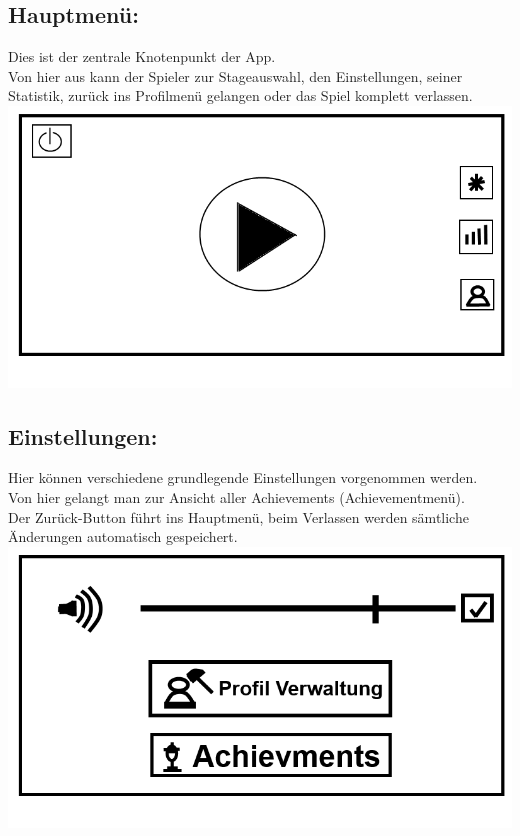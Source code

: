 \documentclass{scrartcl}
\begin{document}
\begin{enumerate}
	\begin{minipage}{1\textwidth}
		\item \subsection*{Hauptmenü:} \label{appaufbau:Hauptmenü}
		Dies ist der zentrale Knotenpunkt der App.\\
		Von hier aus kann der Spieler zur Stageauswahl, den Einstellungen, seiner Statistik, zurück ins Profilmenü gelangen oder das Spiel komplett verlassen.\\
		\includegraphics[scale=0.5]{assets/Mainmenu}
	\end{minipage}
	
	\begin{minipage}{1\textwidth}
		\item \subsection*{Einstellungen:}
		Hier können verschiedene grundlegende Einstellungen vorgenommen werden.\\
		Von hier gelangt man zur Ansicht aller Achievements (Achievementmenü).\\
		Der Zurück-Button führt ins Hauptmenü, beim Verlassen werden sämtliche Änderungen automatisch gespeichert.\\
		\includegraphics[scale=0.5]{assets/Einstellungen}
	\end{minipage}


\end{enumerate}
\end{document}
